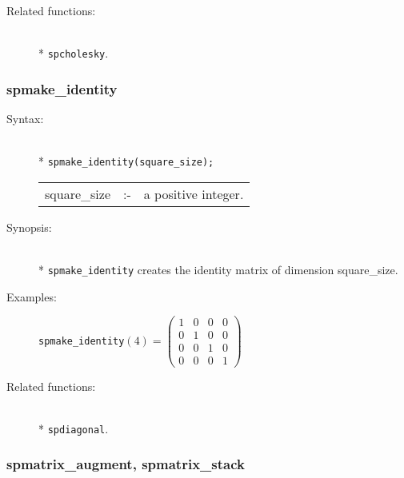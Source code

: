 \begin{description}
\item[Related functions:]\mbox{}\\*
 \texttt{spcholesky}.
\end{description}

\subsubsection{spmake\_identity}
\label{sparse:spmake_identity}

\begin{description}
\item[Syntax:]\mbox{}\\*
 \texttt{spmake\_identity(square\_size);}\\[2mm]
\begin{tabular}{l l l}
square\_size &:-& a positive integer.
\end{tabular}

\item[Synopsis:]\mbox{}\\*
 \texttt{spmake\_identity} creates the identity matrix of
                dimension square\_size.

\item[Examples:]
\begin{flushleft}
\texttt{spmake\_identity}\((4) =
        \begin{pmatrix} 1 & 0 & 0 & 0 \\ 0 & 1 & 0 & 0 \\ 0
& 0 & 1 & 0 \\ 0 & 0 & 0 & 1
 \end{pmatrix}
\)
\end{flushleft}

\item[Related functions:]\mbox{}\\*
\texttt{spdiagonal}.
\end{description}

\subsubsection{spmatrix\_augment, spmatrix\_stack}
\label{sparse:spmatrix_augment}

